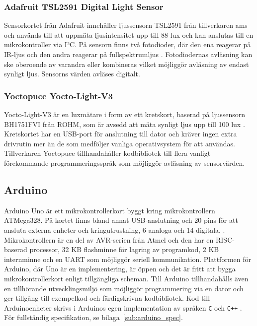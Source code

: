         \subsubsection{Adafruit TSL2591 Digital Light Sensor}
            \label{ssub:ada_tsl2591}
            Sensorkortet från Adafruit innehåller ljussensorn TSL2591 från tillverkaren ams och används till att uppmäta ljusintensitet upp till 88 lux och kan anslutas till en mikrokontroller via I²C. På sensorn finns två fotodioder, där den ena reagerar på IR-ljus och den andra reagerar på fullspektrumljus \cite{TSL2591}. Fotodiodernas avläsning kan ske oberoende av varandra eller kombineras vilket möjliggör avläsning av endast synligt ljus. Sensorns värden avläses digitalt.

        \subsubsection{Yoctopuce Yocto-Light-V3} %
        \label{sub:yocto}
            Yocto-Light-V3 är en luxmätare i form av ett kretskort, baserad på ljussensorn BH1751FVI från ROHM, som är avsedd att mäta synligt ljus upp till 100 lux \cite{yocto}. Kretskortet har en USB-port för anslutning till dator och kräver ingen extra drivrutin mer än de som medföljer vanliga operativsystem för att användas. Tillverkaren Yoctopuce tillhandahåller kodbibliotek till flera vanligt förekommande programmeringsspråk som möjliggör avläsning av sensorvärden.
    \newpage
    \subsection{Arduino} %
    \label{ssub:arduino_uno}
        Arduino Uno är ett mikrokontrollerkort byggt kring mikrokontrollern ATMega328. På kortet finns bland annat USB-anslutning och 20 pins för att ansluta externa enheter och kringutrustning, 6 analoga och 14 digitala. \cite{ard_internals}. Mikrokontrollern är en del av AVR-serien från Atmel och den har en RISC-baserad processor, 32 KB flashminne för lagring av programkod, 2 KB internminne och en UART som möjliggör seriell kommunikation. Plattformen för Arduino, där Uno är en implementering, är öppen och det är fritt att bygga mikrokontrollerkort enligt tillgängliga scheman. Till Arduino tillhandahålls även en tillhörande utvecklingsmiljö som möjliggör programmering via en dator och ger tillgång till exempelkod och färdigskrivna kodbibliotek. Kod till Arduinoenheter skrivs i Arduinos egen implementation av språken \texttt{C} och \texttt{C++} \cite{ard_c, ard_cplusplus}. För fullständig specifikation, se bilaga~\ref{sub:arduino_spec}.
